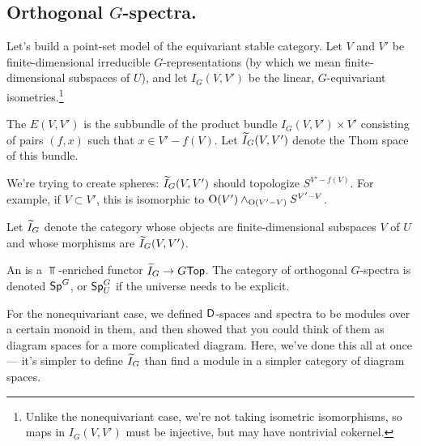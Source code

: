 \subsection*{Orthogonal $G$-spectra.}
Let's build a point-set model of the equivariant stable category. Let $V$ and $V'$ be finite-dimensional
irreducible $G$-representations (by which we mean finite-dimensional subspaces of $U$), and let $I_G(V,V')$ be the
linear, $G$-equivariant isometries.\footnote{Unlike the nonequivariant case, we're not taking isometric
isomorphisms, so maps in $I_G(V,V')$ must be injective, but may have nontrivial cokernel.}
\begin{defn}
The  $E(V,V')$ is the subbundle of the product bundle $I_G(V,V')\times V'$ consisting of
pairs $(f,x)$ such that $x\in V' - f(V)$. Let $\widetilde I_G(V,V')$ denote the Thom space of this bundle.
\end{defn}
We're trying to create spheres: $\widetilde I_G(V,V')$ should topologize $S^{V' - f(V)}$. For example, if $V\subset V'$,
this is isomorphic to $\mathrm O(V')\wedge_{\mathrm O(V'-V)} S^{V' - V}$.

Let $\widetilde I_G$ denote the category whose objects are finite-dimensional subspaces $V$ of $U$ and whose morphisms are
$\widetilde I_G(V,V')$.
\begin{defn}
An  is a $\Top$-enriched functor $\widetilde I_G\to G\mathsf{Top}$. The category of orthogonal
$G$-spectra is denoted $\mathsf{Sp}^G$, or $\mathsf{Sp}^G_U$ if the universe needs to be explicit.
\end{defn}
For the nonequivariant case, we defined $\mathsf D$-spaces and spectra to be modules over a certain monoid in them, and
then showed that you could think of them as diagram spaces for a more complicated diagram. Here, we've done this
all at once --- it's simpler to define $\widetilde I_G$ than find a module in a simpler category of diagram spaces.
% 

